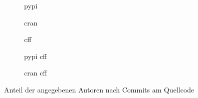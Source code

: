 \begin{figure}
    \begin{subfigure}{.5\textwidth}
        \centering
        
        \caption{\gls{pypi}}
        \label{fig:common_authors_2_pypi}
    \end{subfigure}%
    \begin{subfigure}{.5\textwidth}
        \centering
        
        \caption{\gls{cran}}
        \label{fig:common_authors_2_cran}
    \end{subfigure}
    \begin{subfigure}{.5\textwidth}
        \centering
        
        \caption{\gls{cff}}
        \label{fig:common_authors_2_cff}
    \end{subfigure}%
    \begin{subfigure}{.5\textwidth}
        \centering
        
        \caption{\gls{pypi} \gls{cff}}
        \label{fig:common_authors_2_pypi_cff}
    \end{subfigure}
    \centering
    \begin{subfigure}{.5\textwidth}
        \centering
        
        \caption{\gls{cran} \gls{cff}}
        \label{fig:common_authors_2_cran_cff}
    \end{subfigure}
    \caption{Anteil der angegebenen Autoren nach Commits am Quellcode}
    \label{fig:common_authors_2}
    \small
    \raggedright

\end{figure}

